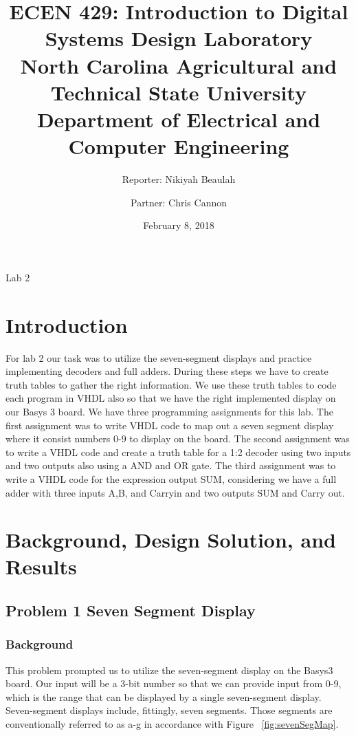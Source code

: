 \documentclass[11pt]{article}
\title {ECEN 429: Introduction to Digital Systems Design Laboratory \\ North Carolina Agricultural and Technical State University \\ Department of Electrical and Computer Engineering} %
\author{Reporter: Nikiyah Beaulah\\ \and Partner: Chris Cannon} %
\date{February 8, 2018}
\begin{document}
\maketitle %

\begin{center}
Lab	2
\end{center}

\pagebreak

\section{Introduction}
For lab 2 our task was to utilize the seven-segment displays and practice implementing decoders and full adders.  During these steps we have to create truth tables to gather the right information. We use these truth tables to code each program in VHDL also so that we have the right implemented display on our Basys 3 board. We have three programming assignments for this lab. The first assignment was to write VHDL code to map out a seven segment display where it consist numbers 0-9 to display on the board. The second assignment was to write a VHDL code and create a truth table for a 1:2 decoder using two inputs and two outputs also using a AND and OR gate.  The third assignment was to write a VHDL code for the expression output SUM, considering we have a full adder with three inputs A,B, and Carryin and two outputs SUM and Carry out. 

\section{Background, Design Solution, and Results}

\subsection{Problem 1 Seven Segment Display}

\subsubsection{Background}
This problem prompted us to utilize the seven-segment display on the Basys3 board. Our input will be a 3-bit number so that we can provide input from 0-9, which is the range that can be displayed by a single seven-segment display. Seven-segment displays include, fittingly, seven segments. Those segments are conventionally referred to as a-g in accordance with Figure ~\ref{fig:sevenSegMap}.
\end{document}
